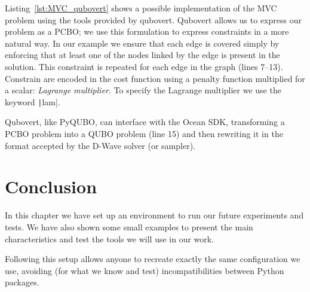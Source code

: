 Listing~\ref{lst:MVC_qubovert} shows a possible implementation of the MVC problem using the tools provided by qubovert. Qubovert allows us to express our problem as a PCBO; we use this formulation to express constraints in a more natural way. In our example we ensure that each edge is covered simply by enforcing that at least one of the nodes linked by the edge is present in the solution. This constraint is repeated for each edge in the graph (lines 7–13). Constrain are encoded in the cost function using a penalty function multiplied for a scalar: \emph{Lagrange multiplier}. To specify the Lagrange multiplier we use the keyword \texttt|lam|.

Qubovert, like PyQUBO, can interface with the Ocean SDK, transforming a PCBO problem into a QUBO problem (line 15) and then rewriting it in the format accepted by the D-Wave solver (or sampler).

\section{Conclusion}
In this chapter we have set up an environment to run our future experiments and tests. We have also shown some small examples to present the main characteristics and test the tools we will use in our work.

Following this setup allows anyone to recreate exactly the same configuration we use, avoiding (for what we know and test) incompatibilities between Python packages.
